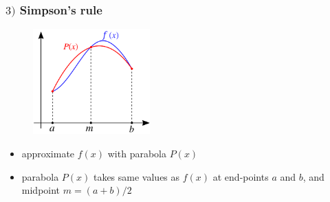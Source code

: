 \documentclass[english,14pt]{beamer}
\newcommand\red[1]{{\color{red} #1}}
\newcommand\blue[1]{{\color{blue} #1}}
\begin{document}
%
%
%
%


\begin{frame}[fragile]

\frametitle{$3)$ Simpson's rule}

\begin{figure}[ht]
	\centering
	\includegraphics[width=0.4\textwidth]{figures/SimpsonsRule}
\end{figure}

\begin{itemize}
	\item approximate \blue{$f(x)$} with parabola \red{$P(x)$}
	\item parabola $P(x)$ takes same values as $f(x)$ at end-points $a$ and $b$, and midpoint $m = (a+b)/2$
\end{itemize}

\end{frame}

\end{document}
